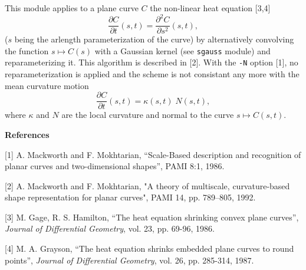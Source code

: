 This module applies to a plane curve $C$ the non-linear heat equation [3,4]
$$\frac{\partial C}{\partial t}(s,t) 
= \frac{\partial^2 C}{\partial s^2}(s,t),$$
($s$ being the arlength parameterization of the curve)
by alternatively convolving the function $s\mapsto C(s)$ with a
Gaussian kernel (see \verb+sgauss+ module) and reparameterizing it.
This algorithm is described in [2]. With
the \verb+-N+ option [1], no reparameterization is applied and the scheme
is not consistant any more with the mean curvature motion
$$\frac{\partial C}{\partial t}(s,t) = \kappa(s,t) \; N(s,t),$$
where $\kappa$ and $N$ are the local curvature and normal to the curve
$s\mapsto C(s,t)$.

\bigskip

{\large \bf References}

\bigskip

[1] A. Mackworth and F. Mokhtarian, ``Scale-Based description 
and recognition of planar curves and two-dimensional shapes'', PAMI 8:1,
1986.

[2] A. Mackworth and F. Mokhtarian, 
"{A theory of multiscale, curvature-based shape representation 
for planar curves}", PAMI 14, pp. 789--805, 1992.

[3] M. Gage, R. S. Hamilton, ``The heat equation shrinking convex 
plane curves'', {\it Journal of Differential Geometry}, vol. 23, pp. 69-96,
1986.

[4] M. A. Grayson, ``The heat equation shrinks embedded plane curves to
round points'', {\it Journal of Differential Geometry}, vol. 26, pp. 285-314,
1987.
